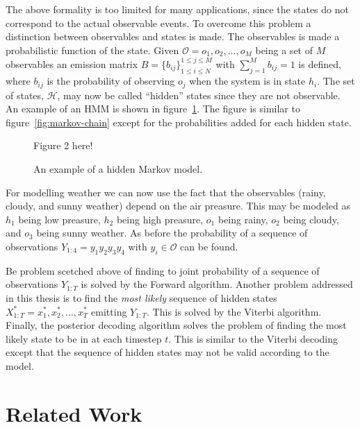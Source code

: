 The above formality is too limited for many applications, since the states do
not correspond to the actual observable events. To overcome this problem a
distinction between observables and states is made. The observables is made a
probabilistic function of the state. Given
$\mathcal{O} = {o_1, o_2, \dots, o_M}$ being a set of $M$ observables an
emission matrix $B = {\{b_{ij}\}}_{1 \le i \le N}^{1 \le j \le M}$ with
$\sum_{j=1}^M b_{ij} = 1$ is defined, where $b_{ij}$ is the probability of
observing $o_j$ when the system is in state $h_i$. The set of states,
$\mathcal{H}$, may now be called ``hidden'' states since they are not
observable. An example of an HMM is shown in
figure~\ref{fig:hidden-markov-model}. The figure is similar to
figure~\ref{fig:markov-chain} except for the probabilities added for each
hidden state.

\begin{figure}
  \centering
  Figure 2 here!
  \caption{An example of a hidden Markov model.}
  \label{fig:hidden-markov-model}
\end{figure}

For modelling weather we can now use the fact that the observables (rainy,
cloudy, and sunny weather) depend on the air preasure. This may be modeled as
$h_1$ being low preasure, $h_2$ being high preasure, $o_1$ being rainy, $o_2$
being cloudy, and $o_3$ being sunny weather. As before the probability of a
sequence of observations $Y_{1:4} = y_1y_2y_3y_4$ with $y_i \in \mathcal{O}$
can be found.

Be problem scetched above of finding to joint probability of a sequence of
observations $Y_{1:T}$ is solved by the Forward algorithm. Another problem
addressed in this thesis is to find the \emph{most likely} sequence of hidden
states $X_{1:T}^* = x_1^*, x_2^*, \dots, x_T^*$ emitting $Y_{1:T}$. This is
solved by the Viterbi algorithm. Finally, the posterior decoding algorithm
solves the problem of finding the most likely state to be in at each timestep
$t$. This is similar to the Viterbi decoding except that the sequence of hidden
states may not be valid according to the model.

\section{Related Work}

